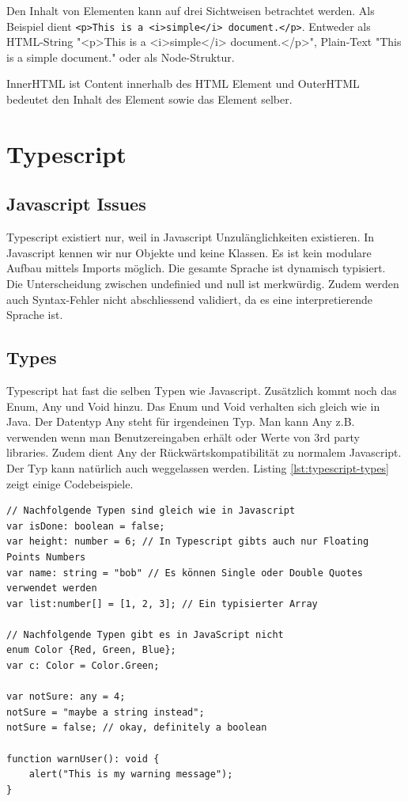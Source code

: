 Den Inhalt von Elementen kann auf drei Sichtweisen betrachtet werden. Als Beispiel dient \lstinline|<p>This is a <i>simple</i> document.</p>|. Entweder als HTML-String "<p>This is a <i>simple</i> document.</p>", Plain-Text "This is a simple document." oder als Node-Struktur.

InnerHTML ist Content innerhalb des HTML Element und OuterHTML bedeutet den Inhalt des Element sowie das Element selber.

\section{Typescript}

\subsection{Javascript Issues}
Typescript existiert nur, weil in Javascript Unzulänglichkeiten existieren. In Javascript kennen wir nur Objekte und keine Klassen. Es ist kein modulare Aufbau mittels Imports möglich. Die gesamte Sprache ist dynamisch typisiert. Die Unterscheidung zwischen undefinied und null ist merkwürdig. Zudem werden auch Syntax-Fehler nicht abschliessend validiert, da es eine interpretierende Sprache ist.

\subsection{Types}
Typescript hat fast die selben Typen wie Javascript. Zusätzlich kommt noch das Enum, Any und Void hinzu. Das Enum und Void verhalten sich gleich wie in Java. Der Datentyp Any steht für irgendeinen Typ. Man kann Any z.B. verwenden wenn man Benutzereingaben erhält oder Werte von 3rd party libraries. Zudem dient Any der Rückwärtskompatibilität zu normalem Javascript. Der Typ kann natürlich auch weggelassen werden. Listing \ref{lst:typescript-types} zeigt einige Codebeispiele.

\begin{lstlisting}[label=lst:typescript-types,caption=Types]
// Nachfolgende Typen sind gleich wie in Javascript
var isDone: boolean = false;
var height: number = 6; // In Typescript gibts auch nur Floating Points Numbers
var name: string = "bob" // Es können Single oder Double Quotes verwendet werden
var list:number[] = [1, 2, 3]; // Ein typisierter Array

// Nachfolgende Typen gibt es in JavaScript nicht
enum Color {Red, Green, Blue};
var c: Color = Color.Green;

var notSure: any = 4;
notSure = "maybe a string instead";
notSure = false; // okay, definitely a boolean

function warnUser(): void {
	alert("This is my warning message");
}
\end{lstlisting}

